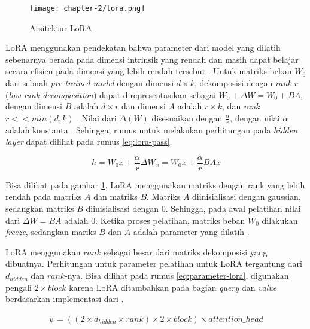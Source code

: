 \begin{figure}[h]
    \vspace{0.25cm}
    \centering
    \texttt{[image: chapter-2/lora.png]}
    \caption{Arsitektur LoRA \parencite{lora}}
    \label{fig:lora_arch}
\end{figure}

LoRA menggunakan pendekatan bahwa parameter dari model yang dilatih sebenarnya berada pada dimensi intrinsik yang rendah dan masih dapat belajar secara efisien pada dimensi yang lebih rendah tersebut \parencite{lora}. Untuk matriks beban $W_0$ dari sebuah \textit{pre-trained model} dengan dimensi $d\times{k}$, dekomposisi dengan \textit{rank} $r$ (\textit{low-rank decomposition}) dapat direpresentasikan sebagai $W_0 + \Delta{W} = W_0 + BA$, dengan dimensi $B$ adalah $d\times{r}$ dan dimensi $A$ adalah $r\times{k}$, dan \textit{rank} $r << min(d,k)$ \parencite{lora}. Nilai dari $\Delta(W)$ disesuaikan dengan $\frac{\alpha}{r}$, dengan nilai $\alpha$ adalah konstanta \parencite{lora}. Sehingga, rumus untuk melakukan perhitungan pada \textit{hidden layer} dapat dilihat pada rumus \ref{eq:lora-pass}.

\begin{equation}
    h = W_{0}x + \frac{\alpha}{r}\Delta{W_x} = W_{0}x + \frac{\alpha}{r}BAx
    \label{eq:lora-pass}
\end{equation}

Bisa dilihat pada gambar \ref{fig:lora_arch}, LoRA menggunakan matriks dengan rank yang lebih rendah pada matriks $A$ dan matriks $B$. Matriks $A$ diinisialisasi dengan gaussian, sedangkan matriks $B$ diinisialisasi dengan 0. Sehingga, pada awal pelatihan nilai dari $\Delta{W}=BA$ adalah 0. Ketika proses pelatihan, matriks beban $W_0$ dilakukan \textit{freeze}, sedangkan mariks $B$ dan $A$ adalah parameter yang dilatih \parencite{lora}.

LoRA menggunakan $rank$ sebagai besar dari matriks dekomposisi yang dibuatnya. Perhitungan untuk parameter pelatihan untuk LoRA tergantung dari $d_{hidden}$ dan $rank$-nya. Bisa dilihat pada rumus \ref{eq:parameter-lora}, digunakan pengali $2 \times block$ karena LoRA ditambahkan pada bagian \textit{query} dan \textit{value} berdasarkan implementasi dari \citeauthor{adapters}.

\begin{equation}
    \begin{aligned}
        \psi = ((2 \times d_{hidden} \times rank) \times 2 \times block) \times attention\_head
    \end{aligned}
    \label{eq:parameter-lora}
\end{equation}

